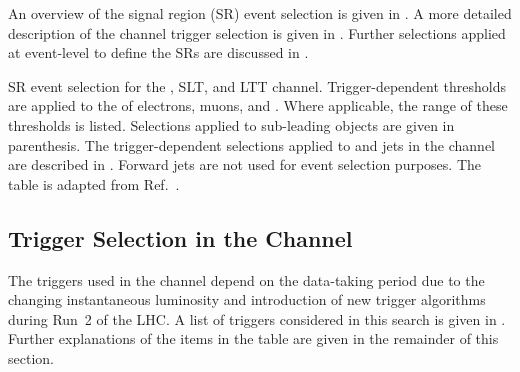 An overview of the signal region (SR) event selection is given in
. A more detailed description of the \hadhad channel
trigger selection is given in . Further
selections applied at event-level to define the SRs are discussed in
.

\begin{table}[htbp]
  \centering

  \caption[SR event selection for the \hadhad, \lephad SLT, and \lephad LTT
  channel.]{SR event selection for the \hadhad, \lephad SLT, and \lephad LTT
    channel. Trigger-dependent thresholds are applied to the \pT of electrons,
    muons, and \tauhadvis. Where applicable, the range of these thresholds is
    listed. Selections applied to \pT sub-leading objects are given in
    parenthesis. The trigger-dependent selections applied to \tauhadvis and jets
    in the \hadhad channel are described in
    . Forward jets are not used for event
    selection purposes. The table is adapted from Ref.~\cite{HDBS-2018-40}.}%
  \label{tab:event_selection}

  \resizebox{\textwidth}{!}{
    
  }
\end{table}


\subsection{Trigger Selection in the \hadhad Channel}%
\label{sec:trigger}%
\label{sec:hadhad_trigger_selection}

The triggers used in the \hadhad channel depend on the data-taking period due to
the changing instantaneous luminosity and introduction of new trigger algorithms
during Run~2 of the LHC.
A list of triggers considered in this search is given in
. Further explanations of the items in the table are
given in the remainder of this section.

